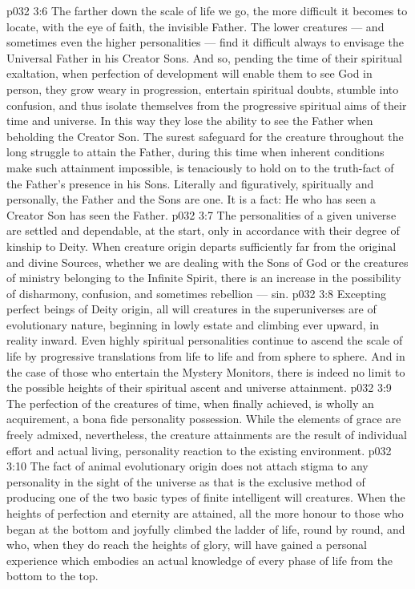 \vs p032 3:6 The farther down the scale of life we go, the more difficult it becomes to locate, with the eye of faith, the invisible Father. The lower creatures --- and sometimes even the higher personalities --- find it difficult always to envisage the Universal Father in his Creator Sons. And so, pending the time of their spiritual exaltation, when perfection of development will enable them to see God in person, they grow weary in progression, entertain spiritual doubts, stumble into confusion, and thus isolate themselves from the progressive spiritual aims of their time and universe. In this way they lose the ability to see the Father when beholding the Creator Son. The surest safeguard for the creature throughout the long struggle to attain the Father, during this time when inherent conditions make such attainment impossible, is tenaciously to hold on to the truth\hyp{}fact of the Father’s presence in his Sons. Literally and figuratively, spiritually and personally, the Father and the Sons are one. It is a fact: He who has seen a Creator Son has seen the Father.
\vs p032 3:7 \pc The personalities of a given universe are settled and dependable, at the start, only in accordance with their degree of kinship to Deity. When creature origin departs sufficiently far from the original and divine Sources, whether we are dealing with the Sons of God or the creatures of ministry belonging to the Infinite Spirit, there is an increase in the possibility of disharmony, confusion, and sometimes rebellion --- sin.
\vs p032 3:8 \pc Excepting perfect beings of Deity origin, all will creatures in the superuniverses are of evolutionary nature, beginning in lowly estate and climbing ever upward, in reality inward. Even highly spiritual personalities continue to ascend the scale of life by progressive translations from life to life and from sphere to sphere. And in the case of those who entertain the Mystery Monitors, there is indeed no limit to the possible heights of their spiritual ascent and universe attainment.
\vs p032 3:9 The perfection of the creatures of time, when finally achieved, is wholly an acquirement, a bona fide personality possession. While the elements of grace are freely admixed, nevertheless, the creature attainments are the result of individual effort and actual living, personality reaction to the existing environment.
\vs p032 3:10 The fact of animal evolutionary origin does not attach stigma to any personality in the sight of the universe as that is the exclusive method of producing one of the two basic types of finite intelligent will creatures. When the heights of perfection and eternity are attained, all the more honour to those who began at the bottom and joyfully climbed the ladder of life, round by round, and who, when they do reach the heights of glory, will have gained a personal experience which embodies an actual knowledge of every phase of life from the bottom to the top.
